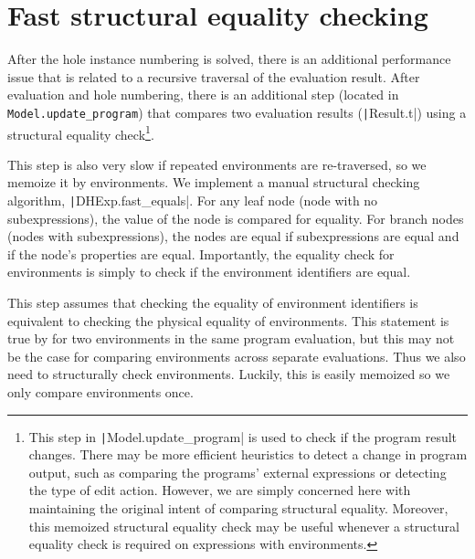 \section{Fast structural equality checking}
\label{sec:fast-equals}

After the hole instance numbering is solved, there is an additional performance issue that is related to a recursive traversal of the evaluation result. After evaluation and hole numbering, there is an additional step (located in \texttt{Model.update_program}) that compares two evaluation results (\texttt|Result.t|) using a structural equality check\footnote{This step in \texttt|Model.update_program| is used to check if the program result changes. There may be more efficient heuristics to detect a change in program output, such as comparing the programs' external expressions or detecting the type of edit action. However, we are simply concerned here with maintaining the original intent of comparing structural equality. Moreover, this memoized structural equality check may be useful whenever a structural equality check is required on expressions with environments.}.

This step is also very slow if repeated environments are re-traversed, so we memoize it by environments. We implement a manual structural checking algorithm, \texttt|DHExp.fast_equals|. For any leaf node (node with no subexpressions), the value of the node is compared for equality. For branch nodes (nodes with subexpressions), the nodes are equal if subexpressions are equal and if the node's properties are equal. Importantly, the equality check for environments is simply to check if the environment identifiers are equal.

This step assumes that checking the equality of environment identifiers is equivalent to checking the physical equality of environments. This statement is true by  for two environments in the same program evaluation, but this may not be the case for comparing environments across separate evaluations. Thus we also need to structurally check environments. Luckily, this is easily memoized so we only compare environments once.

